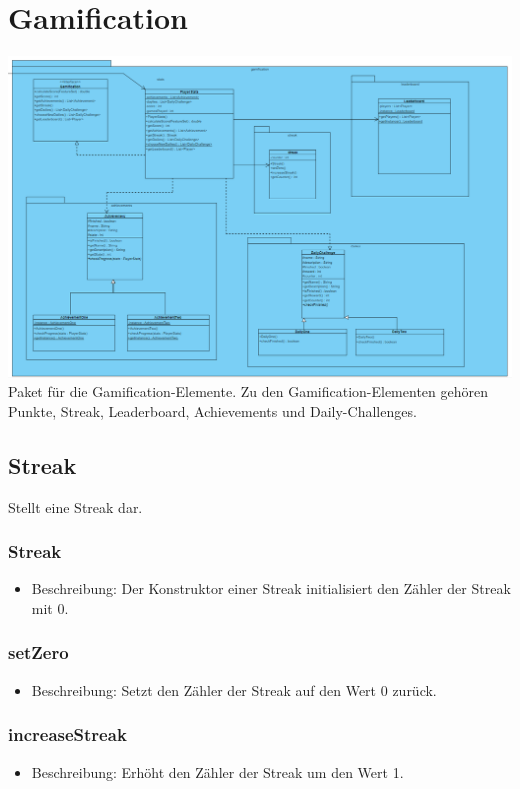 \documentclass[a4paper]{scrreprt}
\begin{document}
	\section{Gamification}
	\includegraphics[width=\textwidth]{img/Gamification.PNG} \\
	
	Paket für die Gamification-Elemente. Zu den Gamification-Elementen gehören Punkte, Streak, Leaderboard, Achievements und Daily-Challenges.
	
	
	\subsection{Streak}
	Stellt eine Streak dar.
	
	\subsubsection{Streak}
	\begin{itemize}
		\item Beschreibung: Der Konstruktor einer Streak initialisiert den Zähler der Streak mit 0.
	\end{itemize}
	\subsubsection{setZero}
	\begin{itemize}
		\item Beschreibung: Setzt den Zähler der Streak auf den Wert 0 zurück.
	\end{itemize}
	\subsubsection{increaseStreak}
	\begin{itemize}
		\item Beschreibung: Erhöht den Zähler der Streak um den Wert 1.
	\end{itemize}
\end{document}
